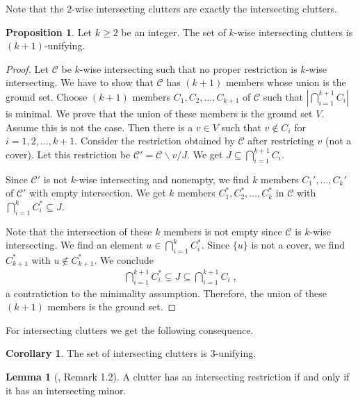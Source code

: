 \documentclass[a4paper, 12pt, twoside=false]{scrbook}
\theoremstyle{definition}
\newtheorem{corollary}[theorem]{Corollary}
\newtheorem{lemma}[theorem]{Lemma}
\newtheorem{proposition}[theorem]{Proposition}
\begin{document}
   Note that the $2$-wise intersecting clutters are exactly the intersecting clutters.
   \begin{proposition}
       Let $k\geq 2$ be an integer.
       The set of $k$-wise intersecting clutters is $(k+1)$-unifying.
   \end{proposition}

   \begin{proof}
       Let $\mathcal{C}$ be $k$-wise intersecting such that no proper restriction is $k$-wise intersecting.
       We have to show that $\mathcal{C}$ has $(k+1)$ members whose union is the ground set.
       Choose $(k+1)$ members $C_1, C_2, \ldots, C_{k+1}$ of $\mathcal{C}$ such that $|\bigcap_{i=1}^{k+1} C_i|$ is minimal.
       We prove that the union of these members is the ground set $V$.
       Assume this is not the case.
       Then there is a $v \in V$ such that $v \not\in C_i$ for $i=1,2, \ldots, k+1$.
       Consider the restriction obtained by $\mathcal{C}$ after restricting $v$ (not a cover).
       Let this restriction be $\mathcal{C'}=\mathcal{C} \backslash v / J$.
       We get $J \subseteq \bigcap_{i=1}^{k+1} C_i$.

       Since $\mathcal{C'}$ is not $k$-wise intersecting and nonempty, we find $k$ members $C_1',\ldots, C_k'$ of $\mathcal{C'}$ with empty intersection.
       We get $k$ members $C_1^*, C_2^*,\ldots, C_k^*$ in $\mathcal{C}$ with $\bigcap_{i=1}^k C_i^* \subseteq J$.

       Note that the intersection of these $k$ members is not empty since $\mathcal{C}$ is $k$-wise intersecting.
       We find an element $u \in \bigcap_{i=1}^k C_i^*$. Since $\{u\}$ is not a cover, we find $C_{k+1}^*$ with $u \not\in C_{k+1}^*$.
       We conclude
       \begin{align*}
           \bigcap_{i=1}^{k+1} C_i^* \subsetneq J \subseteq \bigcap_{i=1}^{k+1} C_i \;,
       \end{align*}
       a contratiction to the minimality assumption.
       Therefore, the union of these $(k+1)$ members is the ground set.


   \end{proof}

   For intersecting clutters we get the following consequence.
   \begin{corollary}
       The set of intersecting clutters is 3-unifying.
   \end{corollary}

   \begin{lemma}[\cite{restrictions}, Remark 1.2]
       A clutter has an intersecting restriction if and only if it has an intersecting minor.
   \end{lemma}
\end{document}
